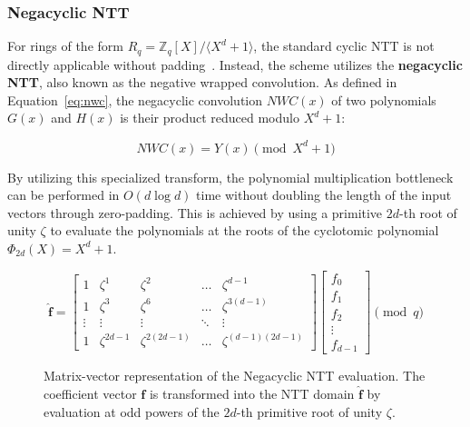 \subsubsection{Negacyclic NTT}
\label{subsubsec:negacyclic_ntt}

For rings of the form $R_q = \mathbb{Z}_q[X] / \langle X^d + 1 \rangle$, the standard cyclic NTT is not directly applicable without padding~\cite{guide_to_ntt}.
Instead, the scheme utilizes the \textbf{negacyclic NTT}, also known as the negative wrapped convolution.
As defined in Equation~\ref{eq:nwc}, the negacyclic convolution $NWC(x)$ of two polynomials $G(x)$ and $H(x)$ is their product reduced modulo $X^d + 1$:

\begin{equation}
    \label{eq:nwc}
    NWC(x) = Y(x) \pmod{X^d + 1}
\end{equation}

By utilizing this specialized transform, the polynomial multiplication bottleneck can be performed in $O(d \log d)$ time without doubling the length of the input vectors through zero-padding.
This is achieved by using a primitive $2d$-th root of unity $\zeta$ to evaluate the polynomials at the roots of the cyclotomic polynomial $\Phi_{2d}(X) = X^d + 1$.

\begin{figure}[htbp]
    \centering
    \begin{equation}
        \hat{\mathbf{f}} =
        \begin{bmatrix}
            1 & \zeta^1 & \zeta^2 & \dots & \zeta^{d-1} \\
            1 & \zeta^3 & \zeta^6 & \dots & \zeta^{3(d-1)} \\
            \vdots & \vdots & \vdots & \ddots & \vdots \\
            1 & \zeta^{2d-1} & \zeta^{2(2d-1)} & \dots & \zeta^{(d-1)(2d-1)}
        \end{bmatrix}
        \begin{bmatrix}
            f_0 \\ f_1 \\ f_2 \\ \vdots \\ f_{d-1}
        \end{bmatrix} \pmod q
    \end{equation}
    \caption{Matrix-vector representation of the Negacyclic NTT evaluation. The coefficient vector $\mathbf{f}$ is transformed into the NTT domain $\hat{\mathbf{f}}$ by evaluation at odd powers of the $2d$-th primitive root of unity $\zeta$. }
    \label{fig:negacyclic_ntt_matrix}
\end{figure}


